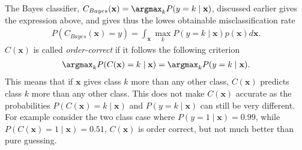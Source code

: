 The Bayes classifier, $C_{Bayes}(\mathbf{x}) = \argmax_k P(y = k \mid \mathbf{x})$, discussed earlier gives the expression above, and gives thus the lowes obtainable misclassification rate
\begin{align}
  \label{eq:bayesBagg} 
  P(C_{Bayes}(\mathbf{x}) = y) = \int_{\mathbf{x}} \max_k P(y=k \mid \mathbf{x})  p(\mathbf{x}) d\mathbf{x}.
\end{align}
$C(\mathbf{x})$ is called \textit{order-correct} if it follows the following criterion
\begin{align}
  \argmax_k P(C(\mathbf{x}) = k \mid \mathbf{x}) = \argmax_k  P(y = k \mid \mathbf{x}).
\end{align}
This means that if $\mathbf{x}$ gives class $k$ more than any other class, $C(\mathbf{x})$ predicts class $k$ more than any other class. This does not make $C(\mathbf{x})$ accurate as the probabilities $P(C(\mathbf{x}) = k \mid \mathbf{x}) $ and $P(y = k \mid \mathbf{x})$ can still be very different. For example consider the two class case where $P(y = 1 \mid \mathbf{x})  = 0.99$, while $P(C(\mathbf{x}) = 1\mid \mathbf{x}) = 0.51$, $C(\mathbf{x})$ is order correct, but not much better than pure guessing.


